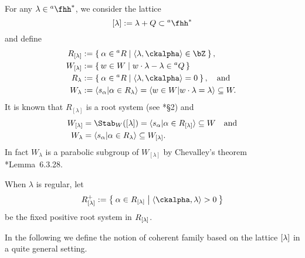 \documentclass[counting_main.tex]{subfiles}
\begin{document}
For any $\lambda\in \hha^{*}$, we consider the lattice
\[
  \Lam := \lambda + Q \subset \ahh^{*}
\]
and define
\begin{equation}
  \label{eq:wlam}
  \begin{split}
    R_{[\lambda]} &:= \Set{\alpha\in \aR| \inn{\lambda}{\ckalpha}\in \bZ},\\
    W_{[\lambda]} &:=
    \set{w\in W | w\cdot \lambda  - \lambda \in \aQ}\\
    R_{\lambda} &:= \Set{\alpha\in \aR| \inn{\lambda}{\ckalpha}=0}, \AND\\
    W_{\lambda} &:= \braket{s_\alpha|\alpha\in R_{\lambda}} = \braket{w\in W|w\cdot \lambda = \lambda} \subseteq W.
  \end{split}
\end{equation}
It is known that $R_{[\lambda]}$ is a root system (see \cite{V4}*{\S 2}) and
\[
  \begin{split}
    W_{[\lambda]} &= \Stab_{W}([\lambda]) = \braket{s_\alpha|\alpha\in R_{[\lambda]}} \subseteq W\quad
    \text{and}\\
    W_{ \lambda } &=   \braket{s_\alpha|\alpha \in R_{\lambda}} \subseteq W_{[\lambda]}.\\
  \end{split}
\]
In fact $W_{\lambda}$ is a parabolic subgroup of $W_{[\lambda]}$ by Chevalley's
theorem \cite{Vg}*{Lemma~6.3.28}.

When $\lambda$ is regular, let
\[
  R^{+}_{\Lam} := \Set{\alpha\in R_{\Lam}| \inn{\ckalpha}{\lambda}>0}
\]
be the fixed positive root system in $R_{{[\lambda]}}$. 

In the following we define the notion of coherent family based on the lattice
${[\lambda]}$ in a quite general setting.
\end{document}
